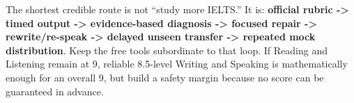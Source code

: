 \documentclass[11pt,a4paper]{article}
\begin{document}
\vfill
\begin{evidencebox}
The shortest credible route is not ``study more IELTS.'' It is: \textbf{official rubric -> timed output -> evidence-based diagnosis -> focused repair -> rewrite/re-speak -> delayed unseen transfer -> repeated mock distribution}. Keep the free tools subordinate to that loop. If Reading and Listening remain at 9, reliable 8.5-level Writing and Speaking is mathematically enough for an overall 9, but build a safety margin because no score can be guaranteed in advance.
\end{evidencebox}
\end{document}
